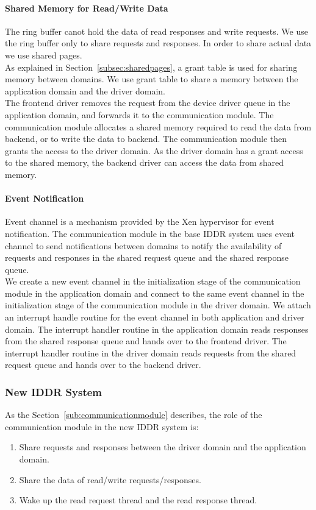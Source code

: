 \paragraph{Shared Memory for Read/Write Data}
The ring buffer canot hold the data of read responses and write requests. We use the ring buffer only to share requests and responses. In order to share actual data we use shared pages. 
\\[3mm]
As explained in Section~\ref{subsec:sharedpages}, a grant table is used for sharing memory between domains. We use grant table to share a memory between the application domain and the driver domain.
\\[3mm]
The frontend driver removes the request from the device driver queue in the application domain, and forwards it to the communication module. The communication module allocates a shared memory required to read the data from backend, or to write the data to backend. The communication module then grants the access to the driver domain. As the driver domain has a grant access to the shared memory, the backend driver can access the data from shared memory.

\paragraph{Event Notification}
Event channel is a mechanism provided by the Xen hypervisor for event notification. The communication module in the base IDDR system uses event channel to send notifications between domains to notify the availability of requests and responses in the shared request queue and the shared response queue. 
\\[3mm]
We create a new event channel in the initialization stage of the communication module in the application domain and connect to the same event channel in the initialization stage of the communication module in the driver domain. We attach an interrupt handle routine for the event channel in both application and driver domain. The interrupt handler routine in the application domain reads responses from the shared response queue and hands over to the frontend driver. The interrupt handler routine in the driver domain reads requests from the shared request queue and hands over to the backend driver.

\subsubsection*{New IDDR System}
As the Section~\ref{sub:communicationmodule} describes, the role of the communication module in the new IDDR system is:
\begin{enumerate} 
\item Share requests and responses between the driver domain and the application domain.
\item Share the data of read/write requests/responses.
\item Wake up the read request thread and the read response thread. 
\end{enumerate}
